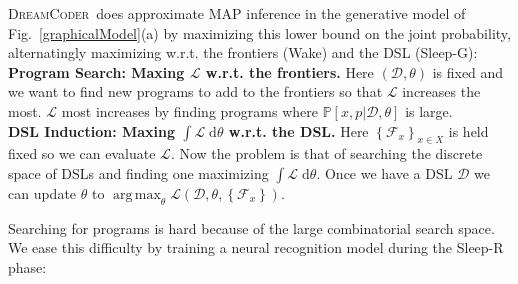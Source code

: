 \documentclass{article}
\newcommand{\system}{\textsc{DreamCoder}~}
\newcommand{\lowerBound}{\mathscr{L}}
\DeclareMathOperator*{\argmax}{arg\,max} %
\newcommand{\probability}{\mathds{P}} %
\begin{document}


\system does approximate MAP inference in the generative model of Fig.~\ref{graphicalModel}(a) by maximizing this lower bound on the joint probability,
alternatingly maximizing w.r.t. the frontiers (Wake) and the DSL (Sleep-G):
\\\noindent \textbf{Program Search: Maxing $\lowerBound$ w.r.t. the frontiers.} Here $(\mathcal{D},\theta)$ is fixed and we
want to find new programs to add to  the frontiers so that $\lowerBound$ increases the most.
$\lowerBound$ most increases by finding programs where $\probability[x,p|\mathcal{D},\theta]$
is large.
\\\noindent \textbf{DSL Induction: Maxing $\int \lowerBound\;\mathrm{d}\theta$ w.r.t. the DSL.} Here $\left\{\mathcal{F}_x \right\}_{x\in X}$ is held fixed so we can evaluate $\lowerBound$. Now the problem is that of searching the discrete space of DSLs and finding one maximizing $\int \lowerBound\;\mathrm{d}\theta$.
Once we have a DSL $\mathcal{D}$ we can update $\theta$ to $\argmax_\theta \lowerBound(\mathcal{D},\theta,\left\{\mathcal{F}_x \right\})$. 


Searching for programs is hard because
of the large combinatorial search space. We ease this difficulty by training a neural recognition model
during the Sleep-R phase:
\end{document}
